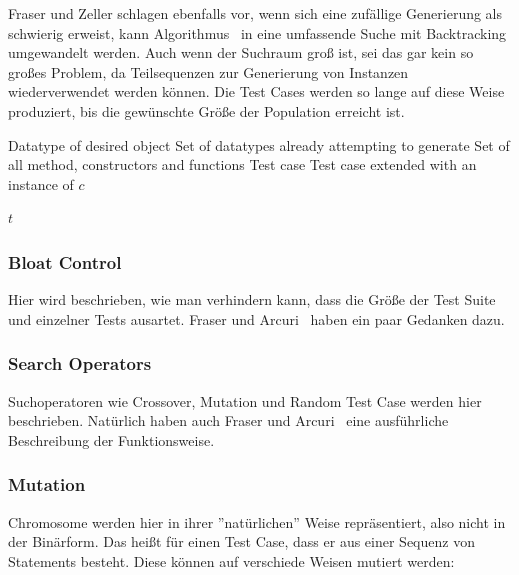 \documentclass{article}
\newcommand{\Desc}[2]{\State \makebox[2em][l]{#1}#2}
\begin{document}
Fraser und Zeller schlagen ebenfalls vor, wenn sich eine zufällige Generierung als schwierig erweist, kann Algorithmus~ in eine umfassende Suche mit Backtracking umgewandelt werden. Auch wenn der Suchraum groß ist, sei das gar kein so großes Problem, da Teilsequenzen zur Generierung von Instanzen wiederverwendet werden können. Die Test Cases werden so lange auf diese Weise produziert, bis die gewünschte Größe der Population erreicht ist. 



\begin{algorithm}[t]
\caption{$GenObject(c, G, M, t)$}\label{alg:random-generation-of-args}
\begin{algorithmic}
\Input
  \Desc{$c$}{Datatype of desired object}
  \Desc{$G$}{Set of datatypes already attempting to generate}
  \Desc{$M$}{Set of all method, constructors and functions}
  \Desc{$t$}{Test case}
\EndInput
\Output
  \Desc{$t$}{Test case extended with an instance of $c$}
\EndOutput    
{}

  \EndIf
\EndFor
{}
\State \Return $t$
\end{algorithmic}
\end{algorithm}

\subsubsection{Bloat Control}
Hier wird beschrieben, wie man verhindern kann, dass die Größe der Test Suite und einzelner Tests ausartet. Fraser und Arcuri~\cite{Fraser_2011} haben ein paar Gedanken dazu. 

\subsubsection{Search Operators}
Suchoperatoren wie Crossover, Mutation und Random Test Case werden hier beschrieben. Natürlich haben auch Fraser und Arcuri~\cite{Fraser_2011} eine ausführliche Beschreibung der Funktionsweise. 

\subsubsection{Mutation}
Chromosome werden hier in ihrer ''natürlichen'' Weise repräsentiert, also nicht in der Binärform. Das heißt für einen Test Case, dass er aus einer Sequenz von Statements besteht. Diese können auf verschiede Weisen mutiert werden: 
\end{document}
